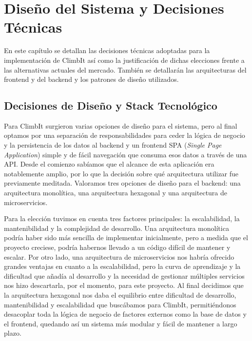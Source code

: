 \chapter{Diseño del Sistema y Decisiones Técnicas}
\label{cap:disenoSistema}

En este capítulo se detallan las decisiones técnicas adoptadas para la implementación de ClimbIt
así como la justificación de dichas elecciones frente a las alternativas actuales del mercado. 
También se detallarán las arquitecturas del frontend y del backend y los patrones de diseño 
utilizados.

\section{Decisiones de Diseño y Stack Tecnológico}

Para ClimbIt surgieron varias opciones de diseño para el sistema, pero al final optamos por 
una separación de responsabilidades para ceder la lógica de negocio y la persistencia de los datos 
al backend y un frontend SPA (\textit{Single Page Application}) simple y de fácil navegación 
que consuma esos datos a través de una API. 
Desde el comienzo sabíamos que el alcance de esta aplicación era notablemente amplio, por lo que 
la decisión sobre qué arquitectura utilizar fue previamente meditada. Valoramos tres opciones de 
diseño para el backend: una arquitectura monolítica, una arquitectura hexagonal y 
una arquitectura de microservicios. 

Para la elección tuvimos en cuenta tres factores principales: la escalabilidad, la mantenibilidad y la complejidad 
de desarrollo. Una arquitectura monolítica podría haber sido más sencilla de implementar inicialmente, pero a 
medida que el proyecto creciese, podría habernos llevado a un código difícil de mantener y escalar. Por otro lado, 
una arquitectura de microservicios nos habría ofrecido grandes ventajas en cuanto a la escalabilidad, pero la curva de 
aprendizaje y la dificultad que añadía al desarrollo y la necesidad de gestionar múltiples servicios nos 
hizo descartarla, por el momento, para este proyecto. Al final decidimos que la arquitectura hexagonal nos daba 
el equilibrio entre dificultad de desarrollo, mantenibilidad y escalabilidad que buscábamos para ClimbIt, permitiéndonos
desacoplar toda la lógica de negocio de factores externos como la base de datos y el frontend, quedando así un sistema 
más modular y fácil de mantener a largo plazo.

